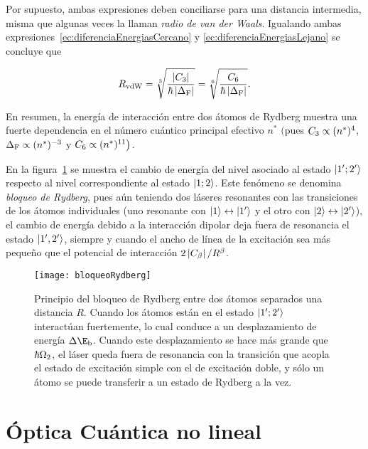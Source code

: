 Por supuesto, ambas expresiones deben conciliarse para una distancia intermedia, misma que algunas veces la llaman \emph{radio de van der Waals}. Igualando ambas expresiones~\ref{ec:diferenciaEnergiasCercano} y \ref{ec:diferenciaEnergiasLejano} se concluye que

\begin{equation}
\label{ec:radiovanderWaals}
R_{\text{vdW}}=\sqrt[3]{\frac{\left|C_{3}\right|}{\hbar\left|\Delta_{\text{F}}\right|}}=\sqrt[6]{\frac{C_{6}}{\hbar\left|\Delta_{\text{F}}\right|}}.
\end{equation}

En resumen, la energía de interacción entre dos átomos de Rydberg muestra una fuerte dependencia en el número cuántico principal efectivo $n^{*}$ $\bigl($pues $C_{3}\propto (n^{*})^{4}$, $\Delta_{\text{F}}\propto (n^{*})^{-3}$ y $C_{6}\propto (n^{*})^{11}\bigr)$.

\p En la figura~\ref{fig:bloqueoRydberg} se muestra el cambio de energía del nivel asociado al estado $\ket{1';2'}$ respecto al nivel correspondiente al estado $\ket{1;2}$. Este fenómeno se denomina \emph{bloqueo de Rydberg}, pues aún teniendo dos láseres resonantes con las transiciones de los átomos individuales (uno resonante con $\ket{1}\leftrightarrow\ket{1'}$ y el otro con $\ket{2}\leftrightarrow\ket{2'}$), el cambio de energía debido a la interacción dipolar deja fuera de resonancia el estado $\ket{1',2'}$, siempre y cuando el ancho de línea de la excitación sea más pequeño que el potencial de interacción $2\left|C_{\beta}\right|/R^{\beta}$.

\begin{figure}
\centering
\begin{minipage}{0.8\textwidth}
\centering
\texttt{[image: bloqueoRydberg]}
\caption[Bloqueo de Rydberg]{\label{fig:bloqueoRydberg}Principio del bloqueo de Rydberg entre dos átomos separados una distancia $R$. Cuando los átomos están en el estado $\ket{1';2'}$ interactúan fuertemente, lo cual conduce a un desplazamiento de energía $\Delta\E_\sm{\text{b}}$. Cuando este desplazamiento se hace más grande que $\hbar\Omega_{2}$, el láser queda fuera de resonancia con la transición que acopla el estado de excitación simple con el de excitación doble, y sólo un átomo se puede transferir a un estado de Rydberg a la vez.}
\end{minipage}
\end{figure}

\section{\label{sec:opticaCuantinaNoLineal}Óptica Cuántica no lineal}

